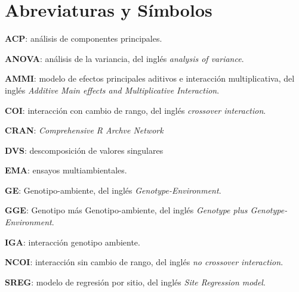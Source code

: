 

\chapter*{Abreviaturas y Símbolos}
\begin{description}
\item{\textbf{ACP}}: análisis de componentes principales.

\item{\textbf{ANOVA}}: análisis de la variancia, del inglés \emph{analysis of variance}.

\item{\textbf{AMMI}}: modelo de efectos principales aditivos e interacción multiplicativa, del inglés \emph{Additive Main effects and Multiplicative Interaction}.

\item{\textbf{COI}}: interacción con cambio de rango, del inglés \emph{crossover interaction}.

\item{\textbf{CRAN}}: \emph{Comprehensive R Archve Network}

\item{\textbf{DVS}}: descomposición de valores singulares

\item{\textbf{EMA}}: ensayos multiambientales.

\item{\textbf{GE}}: Genotipo-ambiente, del inglés \emph{Genotype-Environment}.

\item{\textbf{GGE}}: Genotipo más Genotipo-ambiente, del inglés \emph{Genotype plus Genotype-Environment}.

\item{\textbf{IGA}}: interacción genotipo ambiente.

\item{\textbf{NCOI}}: interacción sin cambio de rango, del inglés \emph{no crossover interaction}.

\item{\textbf{SREG}}: modelo de regresión por sitio, del inglés \emph{Site Regression model}.


\end{description}
